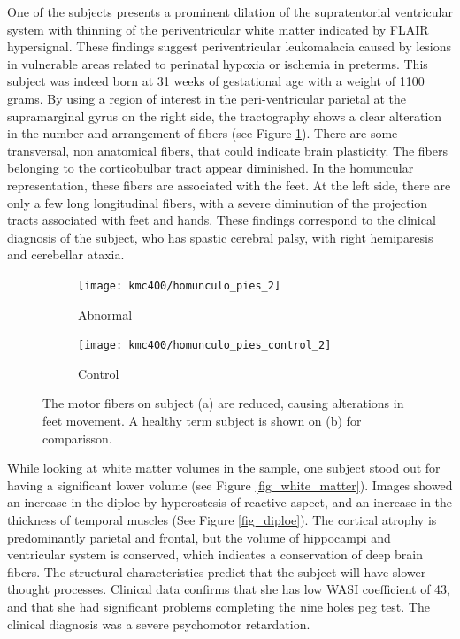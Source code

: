 One of the subjects presents a prominent dilation of the supratentorial ventricular system with thinning of the periventricular white matter indicated by FLAIR hypersignal. These findings suggest periventricular leukomalacia caused by lesions in vulnerable areas related to perinatal hypoxia or ischemia in preterms. This subject was indeed born at 31 weeks of gestational age with a weight of 1100 grams. By using a region of interest in the peri-ventricular parietal at the supramarginal gyrus on the right side, the tractography shows a clear alteration in the number and arrangement of fibers (see Figure \ref{fig_homunculus_feet}). There are some transversal, non anatomical fibers, that could indicate brain plasticity. The fibers belonging to the corticobulbar tract appear diminished. In the homuncular representation, these fibers are associated with the feet. At the left side, there are only a few long longitudinal fibers, with a severe diminution of the projection tracts associated with feet and hands. These findings correspond to the clinical diagnosis of the subject, who has spastic cerebral palsy, with right hemiparesis and cerebellar ataxia.  

\begin{figure}
	\centering
	\begin{subfigure}{0.45\textwidth}
		\texttt{[image: kmc400/homunculo\_pies\_2]}
		\caption{Abnormal}
	\end{subfigure}\hfill
	\begin{subfigure}{0.45\textwidth}
		\texttt{[image: kmc400/homunculo\_pies\_control\_2]}
		\caption{Control}
	\end{subfigure}
	\caption{The motor fibers on subject (a) are reduced, causing alterations in feet movement. A healthy term subject is shown on (b) for comparisson. }
	\label{fig_homunculus_feet}
\end{figure}

While looking at white matter volumes in the sample, one subject stood out for having a significant lower volume (see Figure \ref{fig_white_matter}). Images showed an increase  in the diploe by hyperostesis of reactive aspect, and an increase in the thickness of temporal muscles (See Figure \ref{fig_diploe}). The cortical atrophy is predominantly parietal and frontal, but the volume of hippocampi and ventricular system is conserved, which indicates a conservation of deep brain fibers. The structural characteristics predict that the subject will have slower thought processes. Clinical data confirms that she has low WASI coefficient of 43, and that she had significant problems completing the nine holes peg test. The clinical diagnosis was a severe psychomotor retardation.


